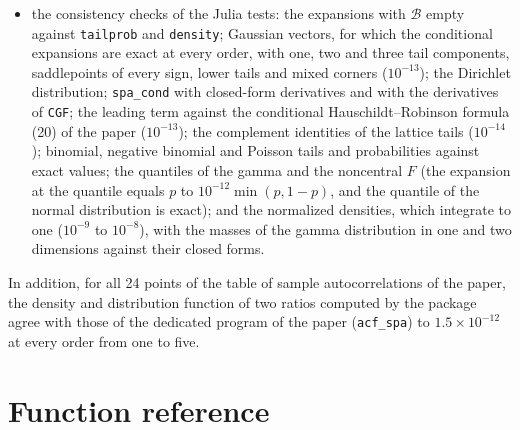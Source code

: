 \documentclass[11pt]{article}
\newcommand{\prog}[1]{\texttt{#1}}
\begin{document}
\begin{itemize}
paper; Skovgaard's formula at the median, where $1/\hat w-1/\hat z$ cancels in double precision, is
left out), the logistic regression (189, against the exact distribution by dynamic programming) and
the lattice sums (88), each relative error to its two printed digits;
\item the consistency checks of the Julia tests: the expansions with $\mathcal B$ empty against
\prog{tailprob} and \prog{density}; Gaussian vectors, for which the conditional expansions are exact
at every order, with one, two and three tail components, saddlepoints of every sign, lower tails and
mixed corners ($10^{-13}$); the Dirichlet distribution; \prog{spa\_cond} with closed-form derivatives
and with the derivatives of \prog{CGF}; the leading term against the conditional
Hauschildt--Robinson formula (20) of the paper ($10^{-13}$); the complement identities of the
lattice tails ($10^{-14}$); binomial, negative binomial and Poisson tails and probabilities against
exact values; the quantiles of the gamma and the noncentral $F$ (the expansion at the quantile equals
$p$ to $10^{-12}\min(p,1-p)$, and the quantile of the normal distribution is exact); and the
normalized densities, which integrate to one ($10^{-9}$ to $10^{-8}$), with the masses of the gamma
distribution in one and two dimensions against their closed forms.
\end{itemize}
In addition, for all 24 points of the table of sample autocorrelations of the paper, the density and
distribution function of two ratios computed by the package agree with those of the dedicated
program of the paper (\prog{acf\_spa}) to $1.5\times10^{-12}$ at every order from one to five.

\section{Function reference}
\end{document}
